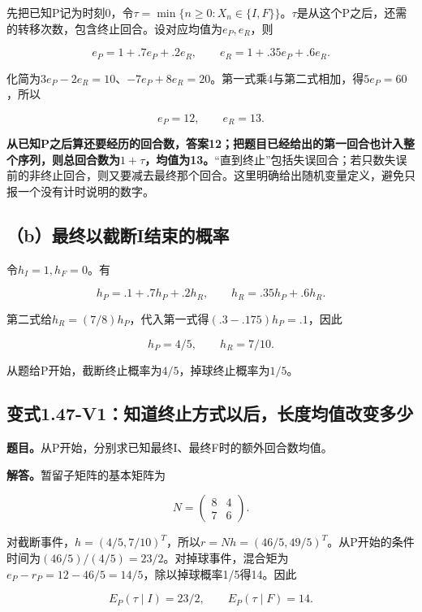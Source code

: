 \documentclass[
  11pt,
  a4paper,
  UTF8,
  fontset=fandol]{ctexart}
\begin{document}
先把已知P记为时刻0，令\(\tau=\min\{n\ge0:X_n\in\{I,F\}\}\)。\(\tau\)是从这个P之后，还需的转移次数，包含终止回合。设对应均值为\(e_P,e_R\)，则

\[
e_P=1+.7e_P+.2e_R,\qquad
 e_R=1+.35e_P+.6e_R.
\]

化简为\(3e_P-2e_R=10\)、\(-7e_P+8e_R=20\)。第一式乘4与第二式相加，得\(5e_P=60\)，所以

\[
\boxed{e_P=12,\qquad e_R=13.}
\]

\textbf{从已知P之后算还要经历的回合数，答案12；把题目已经给出的第一回合也计入整个序列，则总回合数为\(1+\tau\)，均值为13。}``直到终止''包括失误回合；若只数失误前的非终止回合，则又要减去最终那个回合。这里明确给出随机变量定义，避免只报一个没有计时说明的数字。

\subsection{（b）最终以截断I结束的概率}\label{bux6700ux7ec8ux4ee5ux622aux65adiux7ed3ux675fux7684ux6982ux7387}

令\(h_I=1,h_F=0\)。有

\[
h_P=.1+.7h_P+.2h_R,\qquad h_R=.35h_P+.6h_R.
\]

第二式给\(h_R=(7/8)h_P\)，代入第一式得\((.3-.175)h_P=.1\)，因此

\[
\boxed{h_P=4/5,\qquad h_R=7/10.}
\]

从题给P开始，截断终止概率为\(4/5\)，掉球终止概率为\(1/5\)。

\subsection{变式1.47-V1：知道终止方式以后，长度均值改变多少}\label{ux53d8ux5f0f1.47-v1ux77e5ux9053ux7ec8ux6b62ux65b9ux5f0fux4ee5ux540eux957fux5ea6ux5747ux503cux6539ux53d8ux591aux5c11}

\textbf{题目。}从P开始，分别求已知最终I、最终F时的额外回合数均值。

\textbf{解答。}暂留子矩阵的基本矩阵为

\[
N=\begin{pmatrix}8&4\\7&6\end{pmatrix}.
\]

对截断事件，\(h=(4/5,7/10)^T\)，所以\(r=Nh=(46/5,49/5)^T\)。从P开始的条件时间为\((46/5)/(4/5)=23/2\)。对掉球事件，混合矩为\(e_P-r_P=12-46/5=14/5\)，除以掉球概率1/5得14。因此

\[
\boxed{E_P(\tau\mid I)=23/2,\qquad E_P(\tau\mid F)=14.}
\]
\end{document}
